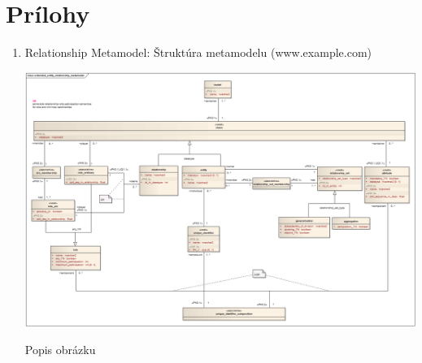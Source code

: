 \section*{Prílohy}
\begin{enumerate}
    \item Relationship Metamodel: Štruktúra metamodelu (www.example.com)
    \begin{appendixfigure}
        \centering
        \includegraphics[height=0.75\textwidth,angle=90]{examples/images/metamodel.png}
        \caption{Popis obrázku}
        \label{fig:appendix-image1}
    \end{appendixfigure}
\end{enumerate}